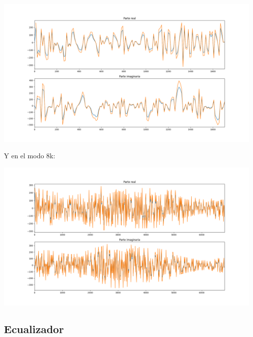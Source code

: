\documentclass[11pt]{scrartcl} %
\begin{document}
\begin{preview}
\begin{minipage}{\linewidth}
	\begin{center}
		\includegraphics[width=1\columnwidth,trim={0 0.5cm 1cm 0.5cm},clip]{../../Linux/Trabajo/TopLevelCCTb/imgs/vsOctave2.png} %
	\end{center}
	\label{modo2kestimar}
\end{minipage}

Y en el modo 8k:

\begin{minipage}{\linewidth}
	\begin{center}
		\includegraphics[width=1\columnwidth,trim={0 0.5cm 1cm 0.5cm},clip]{../../Linux/Trabajo/TopLevelCCTb/imgs/vsOctave8.png} %
	\end{center}
	\label{modo8kestimar}
\end{minipage}

\subsection{Ecualizador}


\end{preview}
\end{document}
